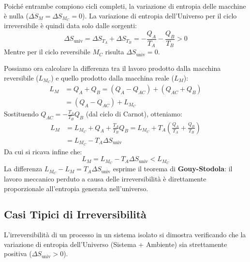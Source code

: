 Poiché entrambe compiono cicli completi, la variazione di entropia delle macchine è nulla ($\Delta S_M = \Delta S_{M_C} = 0$). 
La variazione di entropia dell'Universo per il ciclo irreversibile è quindi data solo dalle sorgenti:
\begin{equation*}
    \Delta S_{\text{univ}} = \Delta S_{T_A} + \Delta S_{T_B} = - \frac{Q_A}{T_A} - \frac{Q_B}{T_B} > 0
\end{equation*}
Mentre per il ciclo reversibile $M_C$ risulta $\Delta S_{\text{univ}} = 0$.

Possiamo ora calcolare la differenza tra il lavoro prodotto dalla macchina reversibile ($L_{M_C}$) e quello prodotto dalla macchina reale ($L_M$):
\begin{align*}
    L_M &= Q_A + Q_B = (Q_A - Q_{AC}) + (Q_{AC} + Q_B) \\
    &= (Q_A - Q_{AC}) + L_{M_C}
\end{align*}
Sostituendo $Q_{AC} = - \frac{T_A}{T_B} Q_B$ (dal ciclo di Carnot), otteniamo:
\begin{align*}
    L_M &= L_{M_C} + Q_A + \frac{T_A}{T_B} Q_B = L_{M_C} + T_A \left( \frac{Q_A}{T_A} + \frac{Q_B}{T_B} \right) \\
    &= L_{M_C} - T_A \Delta S_{\text{univ}}
\end{align*}
Da cui si ricava infine che:
\begin{equation}
    \boxed{ L_M = L_{M_C} - T_A \Delta S_{\text{univ}} < L_{M_C} }
\end{equation}
La differenza $\boxed{ L_{M_C} - L_M = T_A \Delta S_{\text{univ}} }$ esprime il teorema di \textbf{Gouy-Stodola}: il lavoro meccanico perduto a causa delle irreversibilità è direttamente proporzionale all'entropia generata nell'universo.

\subsection{Casi Tipici di Irreversibilità}
L'irreversibilità di un processo in un sistema isolato si dimostra verificando che la variazione di entropia dell'Universo (Sistema + Ambiente) sia strettamente positiva ($\Delta S_{\text{univ}} > 0$).


